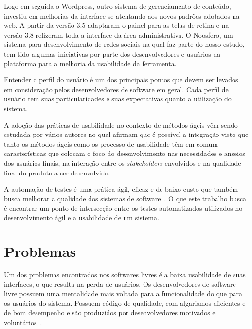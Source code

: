 Logo em seguida o Wordpress, outro sistema de gerenciamento de conteúdo, investiu em melhorias da interface se atentando aos novos padrões adotados na web. A partir da versão 3.5 adaptaram o painel para as telas de retina e na versão 3.8 refizeram toda a interface da área administrativa.
O Noosfero, um sistema para desenvolvimento de redes sociais na qual faz parte do nosso estudo, tem tido algumas iniciativas por parte dos desenvolvedores e usuários da plataforma para a melhoria da usabilidade da ferramenta. 

Entender o perfil do usuário é um dos principais pontos que devem ser levados em consideração pelos desenvolvedores de software em geral. Cada perfil de usuário tem suas particularidades e suas expectativas quanto a utilização do sistema. %

A adoção das práticas de usabilidade no contexto de métodos ágeis vêm sendo estudada por vários autores no qual afirmam que é possível a integração visto que tanto os métodos ágeis como os processo de usabilidade têm em comum características que colocam o foco do desenvolvimento nas necessidades e anseios dos usuários finais, na interação entre os \textit{stakeholders} envolvidos e na qualidade final do produto a ser desenvolvido.



A automação de testes é uma prática ágil, eficaz e de baixo custo que também busca melhorar a qualidade dos sistemas de software~\cite{cotter1995}. O que este trabalho busca é encontrar um ponto de intersecção entre os testes automatizados utilizados no desenvolvimento ágil e a usabilidade de um sistema.

 

\section{Problemas}

Um dos problemas encontrados nos softwares livres é a baixa usabilidade de suas interfaces, o que resulta na perda de usuários. 
%
Os desenvolvedores de software livre possuem uma mentalidade mais voltada para a funcionalidade do que para os usuários do sistema. Possuem código de qualidade, com algarismos eficientes e de bom desempenho e são produzidos por desenvolvedores motivados e voluntários~\cite{santos2012}. 

